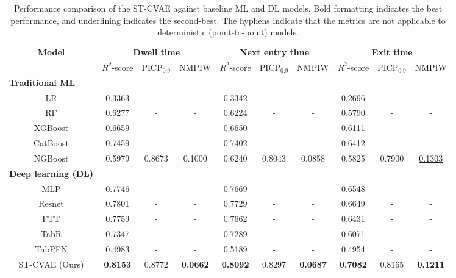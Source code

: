 \documentclass[journal]{IEEEtran}
\begin{document}
\begin{table}[ht]
    \centering
    \caption{Performance comparison of the ST-CVAE against baseline ML and DL models. Bold formatting indicates the best performance, and underlining indicates the second-best. The hyphens indicate that the metrics are not applicable to deterministic (point-to-point) models.}
    \label{tab:table2}
    \begin{tabular}{cccccccccc}
        \toprule
        \multirow{2}{4em}{\textbf{Model}} & \multicolumn{3}{c}{\textbf{Dwell time}} & \multicolumn{3}{c}{\textbf{Next entry time}} & \multicolumn{3}{c}{\textbf{Exit time}} \\
         \cmidrule(rl){2-10}
         & $R^{2}$-score & PICP$_{0.9}$ & NMPIW & $R^{2}$-score & PICP$_{0.9}$ & NMPIW & $R^{2}$-score & PICP$_{0.9}$ & NMPIW \\
        \midrule
        \multicolumn{1}{l}{\textbf{Traditional ML}}&&&&&&&&&\\
        LR       & 0.3363 & -      & -      & 0.3342 & -      & -      & 0.2696 & -      & -      \\
        RF       & 0.6277 & -      & -      & 0.6224 & -      & -      & 0.5790 & -      & -      \\
        XGBoost  & 0.6659 & -      & -      & 0.6650 & -      & -      & 0.6111 & -      & -      \\
        CatBoost & 0.7459 & -      & -      & 0.7402 & -      & -      & 0.6412 & -      & -      \\
        NGBoost  & 0.5979 & 0.8673 & 0.1000 & 0.6240 & 0.8043 & 0.0858 & 0.5825 & 0.7900 & \underline{0.1303} \\
        \multicolumn{1}{l}{\textbf{Deep learning (DL)}}&&&&&&&&&\\
        MLP            & 0.7746 & -      & -      & 0.7669 & -      & -      & 0.6548 & -      & -      \\
        Resnet         & 0.7801 & -      & -      & 0.7729 & -      & -      & 0.6649 & -      & -      \\
        FTT            & 0.7759 & -      & -      & 0.7662 & -      & -      & 0.6431 & -      & -      \\
        TabR           & 0.7347 & -      & -      & 0.7289 & -      & -      & 0.6071 & -      & -      \\
        TabPFN         & 0.4983 & -      & -      & 0.5189 & -      & -      & 0.4954 & -      & -      \\
        ST-CVAE (Ours) & \textbf{0.8153} & 0.8772 & \textbf{0.0662} & \textbf{0.8092} & 0.8297 & \textbf{0.0687} & \textbf{0.7082} & 0.8165 & \textbf{0.1211} \\

\end{tabular}
\end{table}
\end{document}
